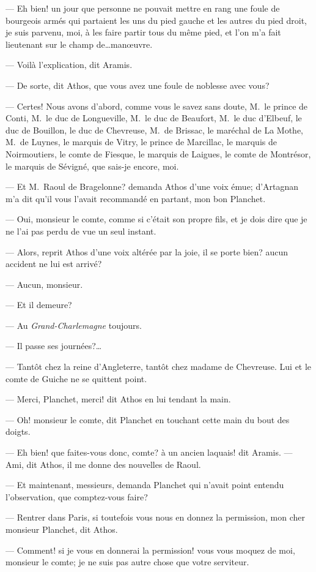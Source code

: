 — Eh bien! un jour que personne ne pouvait mettre en rang une foule de bourgeois armés qui partaient les uns du pied gauche et les autres du pied droit, je suis parvenu, moi, à les faire partir tous du même pied, et l'on m'a fait lieutenant sur le champ de\dots manœuvre.

— Voilà l'explication, dit Aramis.

— De sorte, dit Athos, que vous avez une foule de noblesse avec vous?

— Certes! Nous avons d'abord, comme vous le savez sans doute, M.~le prince de Conti, M.~le duc de Longueville, M.~le duc de Beaufort, M.~le duc d'Elbeuf, le duc de Bouillon, le duc de Chevreuse, M.~de Brissac, le maréchal de La Mothe, M.~de Luynes, le marquis de Vitry, le prince de Marcillac, le marquis de Noirmoutiers, le comte de Fiesque, le marquis de Laigues, le comte de Montrésor, le marquis de Sévigné, que sais-je encore, moi.

— Et M.~Raoul de Bragelonne? demanda Athos d'une voix émue; d'Artagnan m'a dit qu'il vous l'avait recommandé en partant, mon bon Planchet.

— Oui, monsieur le comte, comme si c'était son propre fils, et je dois dire que je ne l'ai pas perdu de vue un seul instant.

— Alors, reprit Athos d'une voix altérée par la joie, il se porte bien? aucun accident ne lui est arrivé?

— Aucun, monsieur.

— Et il demeure?

— Au \textit{Grand-Charlemagne} toujours.

— Il passe ses journées?\dots

— Tantôt chez la reine d'Angleterre, tantôt chez madame de Chevreuse. Lui et le comte de Guiche ne se quittent point.

— Merci, Planchet, merci! dit Athos en lui tendant la main.

— Oh! monsieur le comte, dit Planchet en touchant cette main du bout des doigts.

— Eh bien! que faites-vous donc, comte? à un ancien laquais! dit Aramis.
— Ami, dit Athos, il me donne des nouvelles de Raoul.

— Et maintenant, messieurs, demanda Planchet qui n'avait point entendu l'observation, que comptez-vous faire?

— Rentrer dans Paris, si toutefois vous nous en donnez la permission, mon cher monsieur Planchet, dit Athos.

— Comment! si je vous en donnerai la permission! vous vous moquez de moi, monsieur le comte; je ne suis pas autre chose que votre serviteur.

